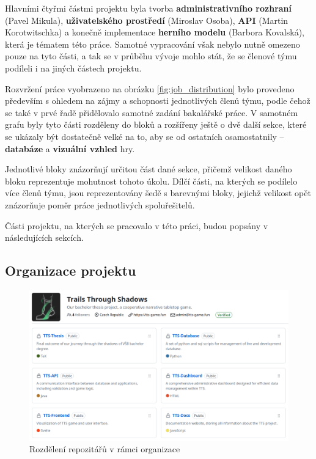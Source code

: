 Hlavními čtyřmi částmi projektu byla tvorba \textbf{administrativního rozhraní} (Pavel Mikula), \textbf{uživatelského prostředí} (Miroslav Osoba), \textbf{API} (Martin Korotwitschka) a konečně implementace \textbf{herního modelu} (Barbora Kovalská), která je tématem této práce. Samotné vypracování však nebylo nutně omezeno pouze na tyto části, a tak se v průběhu vývoje mohlo stát, že se členové týmu podíleli i na jiných částech projektu.

Rozvržení práce vyobrazeno na obrázku \ref{fig:job_distribution} bylo provedeno především s ohledem na zájmy a schopnosti jednotlivých členů týmu, podle čehož se také v prvé řadě přidělovalo samotné zadání bakalářské práce. V samotném grafu byly tyto části rozděleny do bloků a rozšířeny ještě o dvě další sekce, které se ukázaly být dostatečně velké na to, aby se od ostatních osamostatnily -- \textbf{databáze} a \textbf{vizuální vzhled} hry. 

Jednotlivé bloky znázorňují určitou část dané sekce, přičemž velikost daného bloku reprezentuje mohutnost tohoto úkolu. Dílčí části, na kterých se podílelo více členů týmu, jsou reprezentovány šedě s barevnými bloky, jejichž velikost opět znázorňuje poměr práce jednotlivých spoluřešitelů.

Části projektu, na kterých se pracovalo v této práci, budou popsány v následujících sekcích.

\subsection{Organizace projektu}
\label{subsec:versioning}

\begin{figure}[h]
    \centering
    \includegraphics[width=\textwidth]{../../shared/figures/gitOrg.png}
    \caption{Rozdělení repozitářů v rámci organizace}
    \label{fig:git_organization}
\end{figure}

